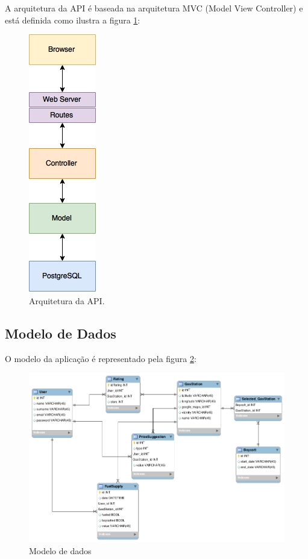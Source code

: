 A arquitetura da API é baseada na arquitetura MVC (Model View Controller) e está definida como ilustra a figura \ref{img:arquitetura}:

\begin{figure}[H]
    \centering
    \includegraphics[scale=0.5]{figuras/api_arch.png}
    \caption[Arquitetura da API]{Arquitetura da API.}
    \label{img:arquitetura}
\end{figure}


\subsection{Modelo de Dados}

O modelo da aplicação é representado pela figura \ref{img:modelo_de_dados}:

\begin{figure}[H]
    \centering
    \includegraphics[scale=0.5]{figuras/db_model.png}
    \caption[Modelo de dados]{Modelo de dados}
    \label{img:modelo_de_dados}
\end{figure}

